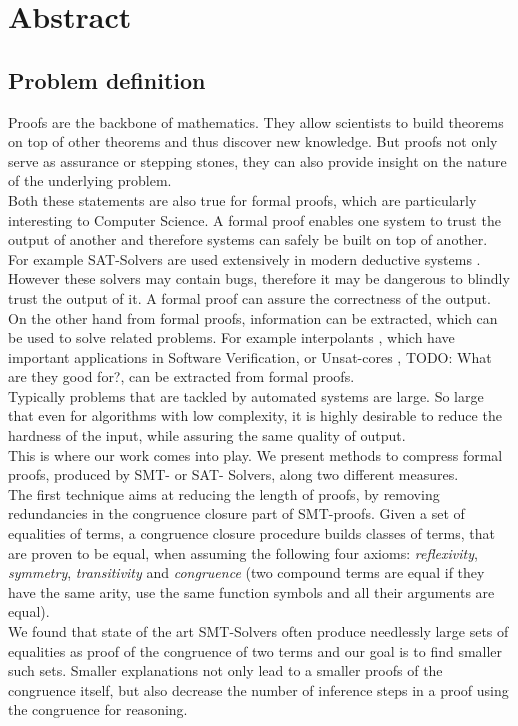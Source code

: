 \chapter*{Abstract}

\section{Problem definition}

Proofs are the backbone of mathematics. 
They allow scientists to build theorems on top of other theorems and thus discover new knowledge.
But proofs not only serve as assurance or stepping stones, they can also provide insight on the nature of the underlying problem.\\
Both these statements are also true for formal proofs, which are particularly interesting to Computer Science.
A formal proof enables one system to trust the output of another and therefore systems can safely be built on top of another. 
For example SAT-Solvers are used extensively in modern deductive systems \cite{TODO}. 
However these solvers may contain bugs, therefore it may be dangerous to blindly trust the output of it.
A formal proof can assure the correctness of the output.\\
On the other hand from formal proofs, information can be extracted, which can be used to solve related problems.
For example interpolants \cite{TODO}, which have important applications in Software Verification, or Unsat-cores \cite{TODO}, TODO: What are they good for?, can be extracted from formal proofs.\\

Typically problems that are tackled by automated systems are large. 
So large that even for algorithms with low complexity, it is highly desirable to reduce the hardness of the input, while assuring the same quality of output.\\
This is where our work comes into play.
We present methods to compress formal proofs, produced by SMT- or SAT- Solvers, along two different measures.\\

The first technique aims at reducing the length of proofs, by removing redundancies in the congruence closure part of SMT-proofs.
Given a set of equalities of terms, a congruence closure procedure builds classes of terms, that are proven to be equal, when assuming the following four axioms: \emph{reflexivity}, \emph{symmetry}, \emph{transitivity} and \emph{congruence} (two compound terms are equal if they have the same arity, use the same function symbols and all their arguments are equal).\\
We found that state of the art SMT-Solvers often produce needlessly large sets of equalities as proof of the congruence of two terms 
and our goal is to find smaller such sets.
Smaller explanations not only lead to a smaller proofs of the congruence itself, 
but also decrease the number of inference steps in a proof using the congruence for reasoning.\\

